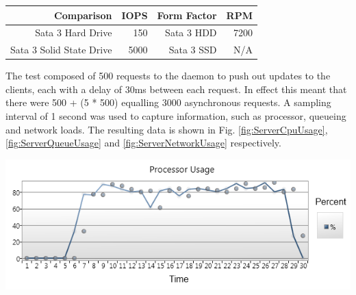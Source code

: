 		
		\begin{tablehere}	
		
			\begin{tabular}{rrrr}

				{\bf Comparison} 						& {\bf IOPS} 	& {\bf Form Factor} 	&  {\bf RPM} 		\\ \hline
				Sata 3 Hard Drive  						&        150 	& Sata 3 HDD 			&       7200 		\\
				Sata 3 Solid State Drive 				&       5000 	& Sata 3 SSD 			&        N/A 		\\

			\end{tabular}  
			
			\caption{Hard Drives Comparison}
			\label{tab:HardDrivesComparison}
			
		\end{tablehere}	
		
\newpage		
		
		\normalsize
		{					
			The test composed of 500 requests to the daemon to push out updates to the clients, each with a delay of 30ms between each request. 
			In effect this meant that there were 500 + (5 * 500) equalling 3000 asynchronous requests.
			\newline
			\newline
			A sampling interval of 1 second was used to capture information, such as processor, queueing and network loads.
			The resulting data is shown in Fig. \ref{fig:ServerCpuUsage}, \ref{fig:ServerQueueUsage} and \ref{fig:ServerNetworkUsage} respectively.
			\newline
		}		
		
		\noindent\begin{minipage}{\textwidth}
			
			\begin{figurehere}
				\centering
				\includegraphics[scale=0.9]{pages/chapter3/figures/server-cpu.png}
				\vspace{-2mm}
				\caption{Server CPU Usage}
				\label{fig:ServerCpuUsage}
			\end{figurehere}	
		
		\end{minipage}
		
